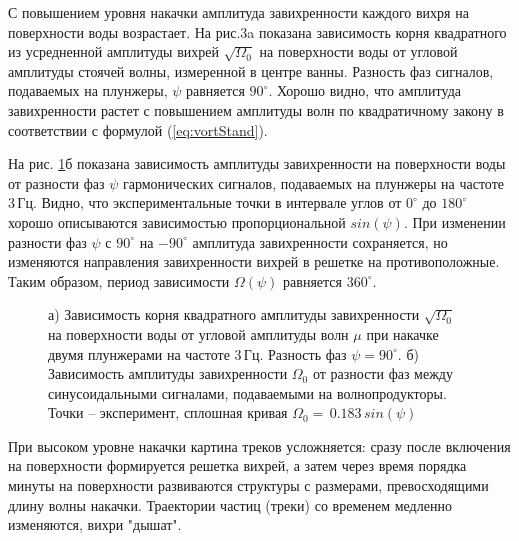 С повышением уровня накачки амплитуда завихренности каждого вихря на поверхности воды возрастает. На рис.3a показана зависимость корня квадратного из усредненной амплитуды вихрей $\sqrt{\Omega_0}$ на поверхности воды от угловой амплитуды стоячей волны, измеренной в центре ванны. Разность фаз сигналов, подаваемых на плунжеры, $\psi$ равняется $90^\circ$. Хорошо видно, что амплитуда завихренности растет с повышением амплитуды волн по квадратичному закону в соответствии с формулой (\ref{eq:vortStand}). 

На рис. \ref{img:ampl_phase}б показана зависимость амплитуды завихренности на поверхности воды от разности фаз $\psi$ гармонических сигналов, подаваемых на плунжеры на частоте 3\,Гц. Видно, что экспериментальные точки в интервале углов от $0^\circ$ до $180^\circ$ хорошо описываются зависимостью пропорциональной $sin(\psi)$. При изменении разности фаз $\psi$ с $90^\circ$ на $-90^\circ$ амплитуда завихренности сохраняется, но изменяются направления завихренности вихрей в решетке на противоположные. Таким образом, период зависимости $\Omega (\psi)$ равняется $360^\circ$. 

\begin{figure}[ht]
 \begin{minipage}[ht]{0.49\linewidth}
 \end{minipage}
 \hfill
 \begin{minipage}[ht]{0.49\linewidth}
 \end{minipage}
 \caption{а) Зависимость корня квадратного амплитуды завихренности $\sqrt{\Omega_0}$ на поверхности воды от угловой амплитуды волн $\mu$ при накачке двумя плунжерами на частоте 3\,Гц. Разность фаз $\psi=90^\circ$. б) Зависимость амплитуды завихренности $\Omega_0$ от разности фаз между синусоидальными сигналами, подаваемыми на волнопродукторы. Точки – эксперимент, сплошная кривая $\Omega_0 = \,0.183\, sin(\psi)$}
 \label{img:ampl_phase} 
\end{figure}


При высоком уровне накачки картина треков усложняется: сразу после включения на поверхности формируется решетка вихрей, а затем через время порядка минуты на поверхности развиваются структуры с размерами, превосходящими длину волны накачки. Траектории частиц (треки) со временем медленно изменяются, вихри "дышат". 

